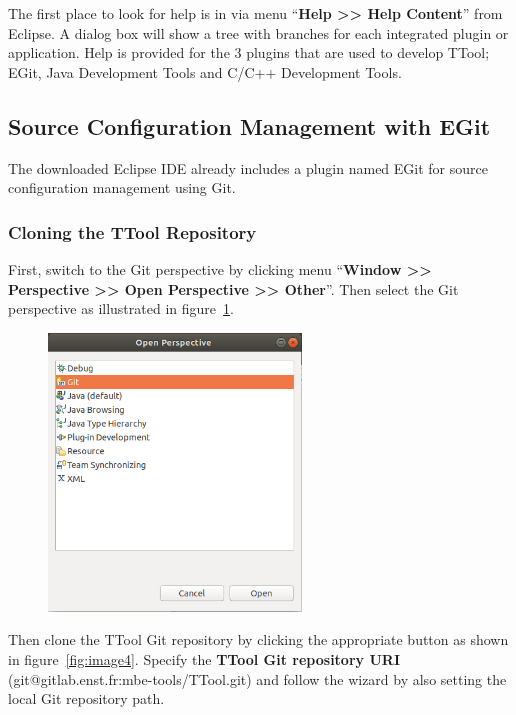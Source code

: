 \documentclass[12pt]{article}
\begin{document}
The first place to look for help is in via menu ``\textbf{Help >> Help Content}'' from
Eclipse. A dialog box will show a tree with branches for each integrated plugin
or application. Help is provided for the 3 plugins that are used to develop
TTool; EGit, Java Development Tools and C/C++ Development Tools.

\subsection{Source Configuration Management with EGit}

The downloaded Eclipse IDE already includes a plugin named EGit for source
configuration management using Git.

\subsubsection{Cloning the TTool Repository}

First, switch to the Git perspective by clicking menu
``\textbf{Window >> Perspective >> Open Perspective >> Other}''. Then select the Git
perspective as illustrated in figure~\ref{fig:image3}.

\begin{figure}[H]
\begin{center}
\includegraphics[width=0.6\textwidth]{images/image4.png}
\end{center}
\caption{}
\label{fig:image3}
\end{figure}

Then clone the TTool Git repository by clicking the appropriate button as shown
in figure~\ref{fig:image4}. Specify the \textbf{TTool Git repository URI}
(git@gitlab.enst.fr:mbe-tools/TTool.git) and follow the wizard by also setting
the local Git repository path.
\end{document}

